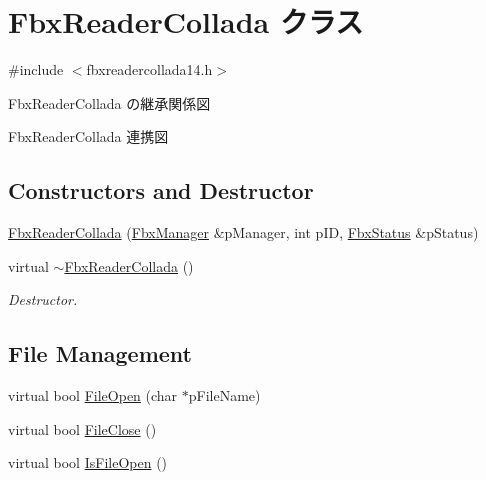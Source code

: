 \hypertarget{class_fbx_reader_collada}{}\section{Fbx\+Reader\+Collada クラス}
\label{class_fbx_reader_collada}


{\ttfamily \#include $<$fbxreadercollada14.\+h$>$}



Fbx\+Reader\+Collada の継承関係図


Fbx\+Reader\+Collada 連携図
\subsection*{Constructors and Destructor}
\begin{DoxyCompactItemize}
\item 
\hyperlink{class_fbx_reader_collada_aec4f19904290f36b47c9de5f193f626a}{Fbx\+Reader\+Collada} (\hyperlink{class_fbx_manager}{Fbx\+Manager} \&p\+Manager, int p\+ID, \hyperlink{class_fbx_status}{Fbx\+Status} \&p\+Status)
\item 
virtual \hyperlink{class_fbx_reader_collada_a0a09a8a6955bc948a743edd1e10f99a1}{$\sim$\+Fbx\+Reader\+Collada} ()
\begin{DoxyCompactList}\small\item\em Destructor. \end{DoxyCompactList}\end{DoxyCompactItemize}
\subsection*{File Management}
\begin{DoxyCompactItemize}
\item 
virtual bool \hyperlink{class_fbx_reader_collada_aec7a5267f85187eeb26dd55ec250119e}{File\+Open} (char $\ast$p\+File\+Name)
\item 
virtual bool \hyperlink{class_fbx_reader_collada_a5668036ed12534fd339f3106c0d09864}{File\+Close} ()
\item 
virtual bool \hyperlink{class_fbx_reader_collada_a6732d6488100827a26065750e80f3a27}{Is\+File\+Open} ()
\end{DoxyCompactItemize}
